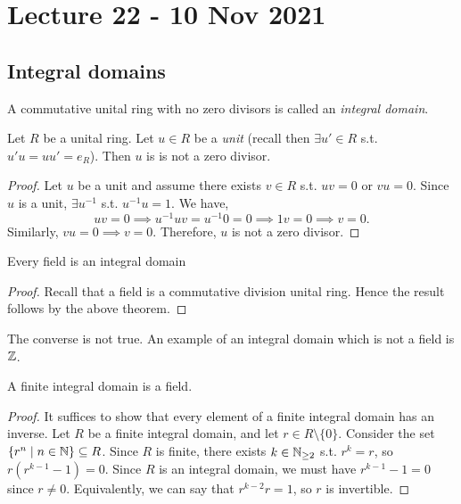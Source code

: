 \section{Lecture 22 - 10 Nov 2021}
\subsection{Integral domains}
\begin{definition}
  A commutative unital ring with no zero divisors is called an \emph{integral domain}.
  \label{def:integralDomain}
\end{definition}

\begin{theorem}
  Let $R$ be a unital ring. Let $u\in R$ be a \emph{unit} (recall then $\exists u'\in R$
  s.t. $u'u=uu'=e_R$). Then $u$ is is not a zero divisor.
  \label{<+label+>}
\end{theorem}
\begin{proof}
  Let $u$ be a unit and assume there exists $v\in R$ s.t. $uv=0$ or $vu=0$. Since $u$ is a unit, $\exists u^{-1}$ s.t. $u^{-1} u=1$. We have,
  $$uv=0 \implies u^{-1}uv=u^{-1}0=0\implies 1v=0 \implies v=0.$$ Similarly, $vu=0 \implies v=0$. Therefore, $u$ is not a zero divisor.
\end{proof}

\begin{corollary}
  Every field is an integral domain
  \label{<+label+>}
\end{corollary}
\begin{proof}
  Recall that a field is a commutative division unital ring. Hence the result follows by
  the above theorem.
\end{proof}
\begin{remark}
  The converse is not true. An example of an integral domain which is not a field is
  $\mathbb Z$.
  \label{<+label+>}
\end{remark}

\begin{theorem}
  A finite integral domain is a field.
\end{theorem}
\begin{proof}
  It suffices to show that every element of a finite integral
  domain has an inverse. Let $R$ be a finite integral domain, and let $r\in R\setminus\{0\}$. Consider the set $\{r^n \mid n\in\mathbb N\}\subseteq R$. Since $R$ is
  finite, there exists $k\in\mathbb N_{\geq 2}$ s.t. $r^k=r$, so $r(r^{k-1}-1)=0$. Since
  $R$ is an integral domain, we must have $r^{k-1}-1 = 0$ since $r \neq 0.$ Equivalently, we can say that $r^{k-2}r=1$, so $r$ is invertible.
  \end{proof}

